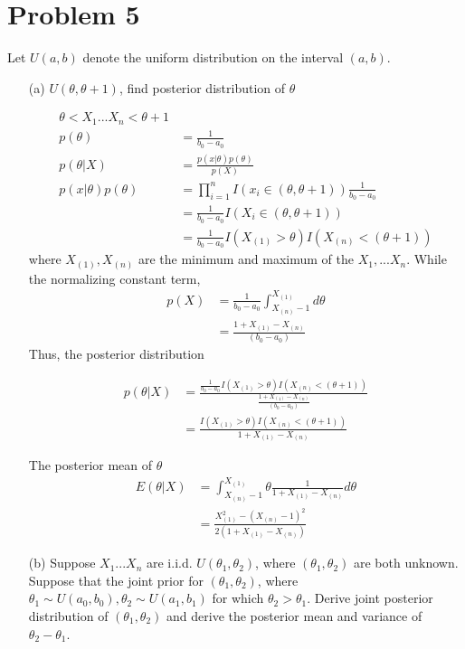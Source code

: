 \documentclass[11pt]{article} %
\begin{document}
\section{Problem 5}
Let $U(a, b)$ denote the uniform distribution on the interval $(a, b)$. 

\begin{itemize}
	\item [(a)] $U(\theta,\theta+1)$, find posterior distribution of $\theta$
	
	\begin{align*}
		\theta < X_1 ... X_n < \theta + 1 \\
		p(\theta) &= \frac{1}{ b_0 - a_0} \\
		p(\theta |X) &= \frac{p(x|\theta) p(\theta)}{p(X)} \\
		p(x|\theta) p(\theta) &= \prod_{i=1}^n I(x_i \in (\theta, \theta + 1)) \frac{1}{ b_0 - a_0} \\
		&= \frac{1}{ b_0 - a_0} I(X_{i} \in (\theta, \theta + 1)) \\
		&=  \frac{1}{ b_0 - a_0}  I(X_{(1)} > \theta) I ( X_{(n)} < (\theta + 1))
	\end{align*}
	where $X_{(1)}, X_{(n)}$ are the minimum and maximum of the $X_1, ... X_n$. 
	While the normalizing constant term,
	\begin{align*}
		p(X) &= \frac{1}{ b_0 - a_0} \int_{X_{(n)}-1} ^{X_{(1)}}  d\theta\\
		&=  \frac{1+ X_{(1)} -X_{(n)}}{ (b_0 - a_0)} 
	\end{align*}	
Thus, the posterior distribution 

	\begin{align*}
	p(\theta|X) &= \frac{\frac{1}{ b_0 - a_0}  I(X_{(1)} > \theta) I ( X_{(n)} < (\theta + 1))}{\frac{1+ X_{(1)} -X_{(n)}}{ (b_0 - a_0)}} \\
	&= \frac{I(X_{(1)} > \theta) I ( X_{(n)} < (\theta + 1))}{1+ X_{(1)} -X_{(n)}}
\end{align*}	

	The posterior mean of $\theta$
\begin{align*}
	E(\theta|X) &=  \int_{X_{(n)}-1} ^{X_{(1)}} \theta \frac{1}{1+ X_{(1)} -X_{(n)}} d\theta\\
	&=  \frac{X_{(1)} ^2 - (X_{(n)}-1)^2}{ 2({1+ X_{(1)} -X_{(n)}}) } 
\end{align*}	
	
\item[(b)] Suppose $X_1...X_n$ are i.i.d. $U(\theta_{1}, \theta_{2})$, where $(\theta_{1}, \theta_{2})$ are both unknown. Suppose that the joint prior for $(\theta_{1}, \theta_{2})$, where $\theta_1 \sim U(a_0, b_0), \theta_2 \sim U(a_1, b_1)$ for which $\theta_2 > \theta_1$. Derive joint posterior distribution of $(\theta_1, \theta_2)$ and derive the posterior mean and variance of $\theta_2 - \theta_1$.


\end{itemize}
\end{document}
